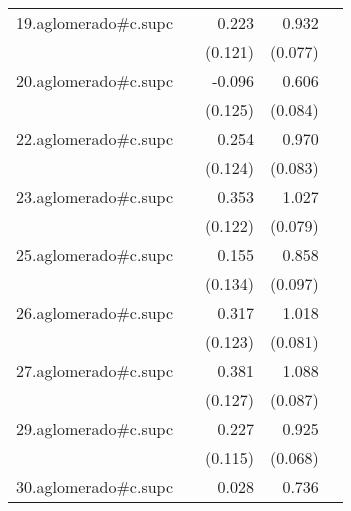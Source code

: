 {\begin{longtable}{l*{4}{D{.}{.}{-1}}}
\addlinespace
19.aglomerado#c.supc&                     &       0.223         &       0.932\sym{***}&                     \\
            &                     &     (0.121)         &     (0.077)         &                     \\
\addlinespace
20.aglomerado#c.supc&                     &      -0.096         &       0.606\sym{***}&                     \\
            &                     &     (0.125)         &     (0.084)         &                     \\
\addlinespace
22.aglomerado#c.supc&                     &       0.254\sym{*}  &       0.970\sym{***}&                     \\
            &                     &     (0.124)         &     (0.083)         &                     \\
\addlinespace
23.aglomerado#c.supc&                     &       0.353\sym{**} &       1.027\sym{***}&                     \\
            &                     &     (0.122)         &     (0.079)         &                     \\
\addlinespace
25.aglomerado#c.supc&                     &       0.155         &       0.858\sym{***}&                     \\
            &                     &     (0.134)         &     (0.097)         &                     \\
\addlinespace
26.aglomerado#c.supc&                     &       0.317\sym{**} &       1.018\sym{***}&                     \\
            &                     &     (0.123)         &     (0.081)         &                     \\
\addlinespace
27.aglomerado#c.supc&                     &       0.381\sym{**} &       1.088\sym{***}&                     \\
            &                     &     (0.127)         &     (0.087)         &                     \\
\addlinespace
29.aglomerado#c.supc&                     &       0.227\sym{*}  &       0.925\sym{***}&                     \\
            &                     &     (0.115)         &     (0.068)         &                     \\
\addlinespace
30.aglomerado#c.supc&                     &       0.028         &       0.736\sym{***}&                     \\

\end{longtable}}
